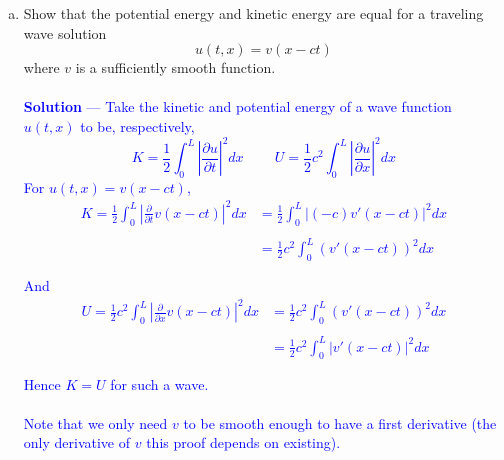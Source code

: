 \documentclass[12pt]{article}
\begin{document}
\begin{enumerate}[(a)]
\item Show that the potential energy and kinetic energy are equal for a traveling wave solution
$$u(t,x) = v(x-ct)$$
where $v$ is a sufficiently smooth function. \\ \\
\textcolor{blue}{\textbf{Solution} — Take the kinetic and potential energy of a wave function $u(t,x)$ to be, respectively, 
$$K = \frac{1}{2} \int_0^L \left| \frac{\partial u}{\partial t} \right|^2 dx \;\;\;\;\;\;\;\; U = \frac{1}{2} c^2 \int_0^L \left| \frac{\partial u}{\partial x} \right|^2 dx$$
For $u(t,x) = v(x - ct)$,
\begin{align*}
K = \frac{1}{2} \int_0^L \left| \frac{\partial}{\partial t} v(x - ct) \right|^2 dx &= \frac{1}{2} \int_0^L \left| (-c)v'(x - ct) \right|^2 dx  \\ \\
&= \frac{1}{2} c^2 \int_0^L (v'(x - ct) )^2 dx \\ \\
\end{align*}
And 
\begin{align*}
U = \frac{1}{2} c^2 \int_0^L \left| \frac{\partial}{\partial x} v(x - ct) \right|^2 dx &= \frac{1}{2} c^2 \int_0^L ( v'(x - ct) )^2 dx\\ \\
&= \frac{1}{2} c^2 \int_0^L \left| v'(x - ct) \right|^2 dx\\ \\
\end{align*}
Hence $K=U$ for such a wave. \\ \\ Note that we only need $v$ to be smooth enough to have a first derivative (the only derivative of $v$ this proof depends on existing).
}
\end{enumerate}

\vspace{0.2in}
\end{document}
